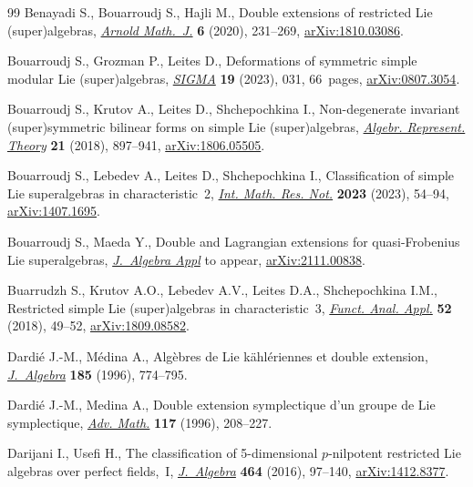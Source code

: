 \begin{thebibliography}{99}
Benayadi S., Bouarroudj S., Hajli M., Double extensions of restricted {L}ie
 (super)algebras, \href{https://doi.org/10.1007/s40598-020-00149-5}{\textit{Arnold Math.~J.}} \textbf{6} (2020), 231--269,
 \href{https://arxiv.org/abs/1810.03086}{arXiv:1810.03086}.

Bouarroudj S., Grozman P., Leites D., Deformations of symmetric simple modular
 {L}ie (super)algebras, \href{https://doi.org/10.3842/SIGMA.2023.031}{\textit{SIGMA}} \textbf{19} (2023), 031, 66~pages,
 \href{https://arxiv.org/abs/0807.3054}{arXiv:0807.3054}.

Bouarroudj S., Krutov A., Leites D., Shchepochkina I., Non-degenerate invariant
 (super)symmetric bilinear forms on simple {L}ie (super)algebras,
 \href{https://doi.org/10.1007/s10468-018-9802-8}{\textit{Algebr. Represent. Theory}} \textbf{21} (2018), 897--941,
 \href{https://arxiv.org/abs/1806.05505}{arXiv:1806.05505}.

Bouarroudj S., Lebedev A., Leites D., Shchepochkina I., Classification of
 simple {L}ie superalgebras in characteristic~2, \href{https://doi.org/10.1093/imrn/rnab265}{\textit{Int. Math. Res. Not.}}
 \textbf{2023} (2023), 54--94, \href{https://arxiv.org/abs/1407.1695}{arXiv:1407.1695}.

Bouarroudj S., Maeda Y., Double and {L}agrangian extensions for
 quasi-{F}robenius {L}ie superalgebras, \href{https://doi.org/10.1142/S0219498824500014}{\textit{J.~Algebra Appl}} {t}o appear,
 \href{https://arxiv.org/abs/2111.00838}{arXiv:2111.00838}.

Buarrudzh S., Krutov A.O., Lebedev A.V., Leites D.A., Shchepochkina I.M.,
 Restricted simple {L}ie (super)algebras in characteristic~3, \href{https://doi.org/10.1007/s10688-018-0206-7}{\textit{Funct.
 Anal. Appl.}} \textbf{52} (2018), 49--52, \href{https://arxiv.org/abs/1809.08582}{arXiv:1809.08582}.

Dardi\'e J.-M., M\'edina A., Alg\`ebres de {L}ie k\"ahl\'eriennes et double
 extension, \href{https://doi.org/10.1006/jabr.1996.0350}{\textit{J.~Algebra}} \textbf{185} (1996), 774--795.

Dardi\'e J.-M., Medina A., Double extension symplectique d'un groupe de {L}ie
 symplectique, \href{https://doi.org/10.1006/aima.1996.0009}{\textit{Adv. Math.}} \textbf{117} (1996), 208--227.

Darijani I., Usefi H., The classification of 5-dimensional {$p$}-nilpotent
 restricted {L}ie algebras over perfect fields,~{I}, \href{https://doi.org/10.1016/j.jalgebra.2016.06.011}{\textit{J.~Algebra}}
 \textbf{464} (2016), 97--140, \href{https://arxiv.org/abs/1412.8377}{arXiv:1412.8377}.


\end{thebibliography}
